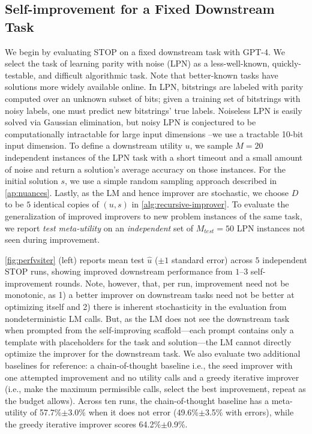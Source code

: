 \documentclass{article} %
\newcommand{\metautil}{{\hat{u}}}
\newcommand{\sol}{{s}}
\begin{document}
\subsection{Self-improvement for a Fixed Downstream Task}\label{sec:fixed} 
%
We begin by evaluating STOP on a fixed downstream task with GPT-4.
%
%
%
%
We select the task of learning parity with noise (LPN) \citep{blum2000noise} as a less-well-known, quickly-testable, and difficult algorithmic task. Note that better-known tasks have solutions more widely available online.
In LPN, bitstrings are labeled with parity computed over an unknown subset of bits; given a training set of bitstrings with noisy labels, one must predict new bitstrings' true labels. 
%
Noiseless LPN is easily solved via Gaussian elimination, but noisy LPN is conjectured to be computationally intractable for large input dimensions \citep{blum2000noise}--we use a tractable 10-bit input dimension. 
%
To define a downstream utility $u$, we sample $M=20$ independent instances of the LPN task with a short timeout and a small amount of noise and return a solution's average accuracy on those instances. For the initial solution $\sol$, we use a simple random sampling approach described in \cref{ap:nuances}. Lastly, as the LM and hence improver are stochastic, we choose $D$ to be $5$ identical copies of $(u,\sol)$ in \cref{alg:recursive-improver}. To evaluate the generalization of improved improvers to new problem instances of the same task, we report \emph{test meta-utility} on an \emph{independent} set of $M_{test}=50$ LPN instances not seen during improvement.\vspace{-2px}

%
%
\cref{fig:perfvsiter} (left) reports mean test $\metautil$ ($\pm 1$ standard error) across $5$ independent STOP runs, 
showing improved downstream performance from $1$--$3$ self-improvement rounds.
%
Note, however, that, per run, improvement need not be monotonic, as 1) a better improver on downstream tasks need not be better at optimizing itself and 2) there is inherent stochasticity in the evaluation from nondeterministic LM calls. But, as the LM does not see the downstream task when prompted from the self-improving scaffold---each prompt contains only a template with placeholders for the task and solution---the LM cannot directly optimize the improver for the downstream task. We also evaluate two additional baselines for reference: a chain-of-thought baseline i.e., the seed improver with one attempted improvement and no utility calls \citep{wei_chain_2022}  and a greedy iterative improver (i.e., make the maximum permissible calls, select the best improvement, repeat as the budget allows). Across ten runs, the chain-of-thought baseline has a meta-utility of 57.7\%$\pm$3.0\% when it does not error (49.6\%$\pm$3.5\% with errors), while the greedy iterative improver scores 64.2\%$\pm$0.9\%. \vspace{-1px}
%
%
\end{document}
